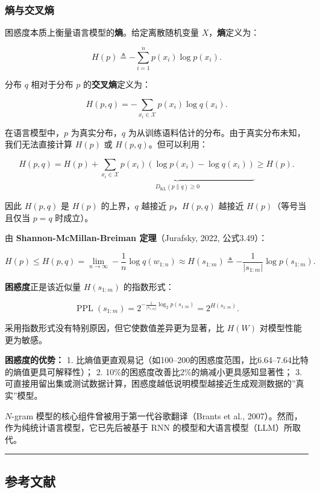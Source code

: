 \documentclass[
  11pt,
  a4paper,
]{article}
\begin{document}
\subsubsection{熵与交叉熵}\label{ux71b5ux4e0eux4ea4ux53c9ux71b5}

困惑度本质上衡量语言模型的\textbf{熵}。给定离散随机变量
\(X\)，\textbf{熵}定义为：

\[H(p) \triangleq -\sum_{i=1}^n p(x_i) \log p(x_i).\]

分布 \(q\) 相对于分布 \(p\) 的\textbf{交叉熵}定义为：

\[H(p, q) = -\sum_{x_i \in \mathcal{X}} p(x_i) \log q(x_i).\]

在语言模型中，\(p\) 为真实分布，\(q\)
为从训练语料估计的分布。由于真实分布未知，我们无法直接计算 \(H(p)\) 或
\(H(p,q)\)。但可以利用：

\[H(p, q) = H(p) + \underbrace{\sum_{x_i \in \mathcal{X}} p(x_i) \left(\log p(x_i) - \log q(x_i)\right)}_{D_{\text{KL}}(p \| q) \geq 0} \geq H(p).\]

因此 \(H(p,q)\) 是 \(H(p)\) 的上界，\(q\) 越接近 \(p\)，\(H(p,q)\)
越接近 \(H(p)\)（等号当且仅当 \(p = q\) 时成立）。

由 \textbf{Shannon-McMillan-Breiman 定理}（Jurafsky, 2022, 公式3.49）：

\[H(p) \leq H(p, q) = \lim_{n \to \infty} -\frac{1}{n} \log q(w_{1:n}) \approx H(s_{1:m}) \triangleq -\frac{1}{|s_{1:m}|} \log p(s_{1:m}).\]

\textbf{困惑度}正是该近似量 \(H(s_{1:m})\) 的指数形式：

\[\operatorname{PPL}(s_{1:m}) = 2^{-\frac{1}{|s_{1:m}|} \log_2 p(s_{1:m})} = 2^{H(s_{1:m})}.\]

采用指数形式没有特别原因，但它使数值差异更为显著，比 \(H(W)\)
对模型性能更为敏感。

\textbf{困惑度的优势：} 1.
比熵值更直观易记（如100--200的困惑度范围，比6.64--7.64比特的熵值更具可解释性）；
2. 10\%的困惑度改善比2\%的熵减小更具感知显著性； 3.
可直接用留出集或测试数据计算，困惑度越低说明模型越接近生成观测数据的''真实''模型。

\(N\)-gram 模型的核心组件曾被用于第一代谷歌翻译（Brants et al.,
2007）。然而，作为纯统计语言模型，它已先后被基于 RNN
的模型和大语言模型（LLM）所取代。

\begin{center}\rule{0.5\linewidth}{0.5pt}\end{center}

\subsection{参考文献}\label{ux53c2ux8003ux6587ux732e}
\end{document}
